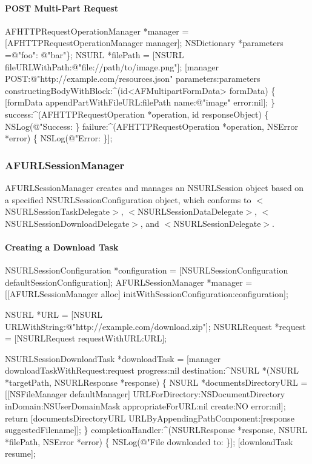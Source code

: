 \paragraph*{{\ttfamily P\+O\+ST} Multi-\/\+Part Request}


\begin{DoxyCode}
AFHTTPRequestOperationManager *manager = [AFHTTPRequestOperationManager manager];
NSDictionary *parameters =@"foo": @"bar"\};
NSURL *filePath = [NSURL fileURLWithPath:@"file://path/to/image.png"];
[manager POST:@"http://example.com/resources.json" parameters:parameters
       constructingBodyWithBlock:^(id<AFMultipartFormData> formData) \{
    [formData appendPartWithFileURL:filePath name:@"image" error:nil];
\} success:^(AFHTTPRequestOperation *operation, id responseObject) \{
    NSLog(@"Success: %
\} failure:^(AFHTTPRequestOperation *operation, NSError *error) \{
    NSLog(@"Error: %
\}];
\end{DoxyCode}
 



\subsubsection*{A\+F\+U\+R\+L\+Session\+Manager}

{\ttfamily A\+F\+U\+R\+L\+Session\+Manager} creates and manages an {\ttfamily N\+S\+U\+R\+L\+Session} object based on a specified {\ttfamily N\+S\+U\+R\+L\+Session\+Configuration} object, which conforms to {\ttfamily $<$N\+S\+U\+R\+L\+Session\+Task\+Delegate$>$}, {\ttfamily $<$N\+S\+U\+R\+L\+Session\+Data\+Delegate$>$}, {\ttfamily $<$N\+S\+U\+R\+L\+Session\+Download\+Delegate$>$}, and {\ttfamily $<$N\+S\+U\+R\+L\+Session\+Delegate$>$}.

\paragraph*{Creating a Download Task}


\begin{DoxyCode}
NSURLSessionConfiguration *configuration = [NSURLSessionConfiguration defaultSessionConfiguration];
AFURLSessionManager *manager = [[AFURLSessionManager alloc] initWithSessionConfiguration:configuration];

NSURL *URL = [NSURL URLWithString:@"http://example.com/download.zip"];
NSURLRequest *request = [NSURLRequest requestWithURL:URL];

NSURLSessionDownloadTask *downloadTask = [manager downloadTaskWithRequest:request progress:nil
       destination:^NSURL *(NSURL *targetPath, NSURLResponse *response) \{
    NSURL *documentsDirectoryURL = [[NSFileManager defaultManager] URLForDirectory:NSDocumentDirectory
       inDomain:NSUserDomainMask appropriateForURL:nil create:NO error:nil];
    return [documentsDirectoryURL URLByAppendingPathComponent:[response suggestedFilename]];
\} completionHandler:^(NSURLResponse *response, NSURL *filePath, NSError *error) \{
    NSLog(@"File downloaded to: %
\}];
[downloadTask resume];
\end{DoxyCode}


